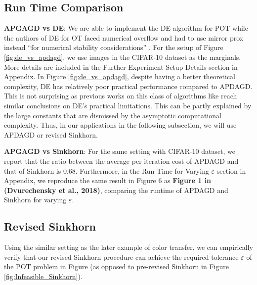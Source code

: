 \subsection{Run Time Comparison}
\textbf{APGAGD vs DE}: We are able to implement the DE algorithm for POT while the authors of DE for OT faced numerical overflow and had to use mirror prox instead “for numerical stability considerations” \cite{Jambulapati-2019-Direct}. For the setup of Figure \ref{fig:de_vs_apdagd}, we use images in the CIFAR-10 dataset \citep{krizhevsky2009learning} as the marginals. More details are included in the Further Experiment Setup Details section in Appendix. In Figure \ref{fig:de_vs_apdagd}, despite having a better theoretical complexity, DE has relatively poor practical performance compared to APDAGD. This is not surprising as previous works on this class of algorithms like \citep{pmlr-v130-dvinskikh21a} reach similar conclusions on DE's practical limitations. This can be partly explained by the large constants that are dismissed by the asymptotic computational complexity. Thus, in our applications in the following subsection, we will use APDAGD or revised Sinkhorn.

\textbf{APGAGD vs Sinkhorn}: For the same setting with CIFAR-10 dataset, we report that the ratio between the average per iteration cost of APDAGD and that of Sinkhorn is 0.68. Furthermore, in the Run Time for Varying $\varepsilon$ section in Appendix, we reproduce the same result in Figure 6 as \textbf{Figure 1 in (Dvurechensky et al., 2018)}, comparing the runtime of APDAGD and Sinkhorn for varying $\varepsilon$.


\subsection{Revised Sinkhorn}
Using the similar setting as the later example of color transfer, we can empirically verify that our revised Sinkhorn procedure can achieve the required tolerance $\varepsilon$ of the POT problem in Figure  (as opposed to pre-revised Sinkhorn in Figure \ref{fig:Infeasible_Sinkhorn}).


